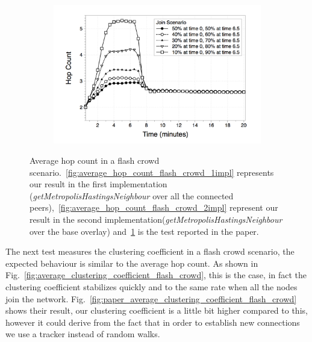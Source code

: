 \begin{figure}
\begin{subfigure}{.5\textwidth}
  \includegraphics[keepaspectratio=true, width=1\linewidth]{images/paper_average_hop_count_flash_crowd}
  \caption{}
  \label{fig:paper_average_hop_count_flash_crowd}
\end{subfigure}
\caption{Average hop count in a flash crowd scenario.~\ref{fig:average_hop_count_flash_crowd_1impl} represents our result in the first implementation (\textit{getMetropolisHastingsNeighbour} over all the connected peers),~\ref{fig:average_hop_count_flash_crowd_2impl} represent our result in the second implementation(\textit{getMetropolisHastingsNeighbour} over the base overlay) and~\ref{fig:paper_average_hop_count_flash_crowd} is the test reported in the paper.}
\label{fig:robustness_hop_count_flash_crowd}
\end{figure}

The next test measures the clustering coefficient in a flash crowd scenario, the expected behaviour is similar to the average hop count. As shown in Fig.~\ref{fig:average_clustering_coefficient_flash_crowd}, this is the case, in fact the clustering coefficient stabilizes quickly and to the same rate when all the nodes join the network. Fig.~\ref{fig:paper_average_clustering_coefficient_flash_crowd} shows their result, our clustering coefficient is a little bit higher compared to this, however it could derive from the fact that in order to establish new connections we use a tracker instead of random walks.

